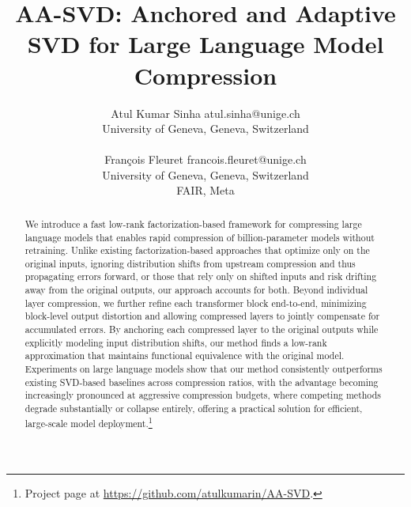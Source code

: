 \documentclass[10pt]{article} %
\title{AA-SVD: Anchored and Adaptive SVD for Large Language Model Compression}
\author{\name Atul Kumar Sinha \email atul.sinha@unige.ch \\
      University of Geneva, Geneva, Switzerland\\ \\
      \AND
      \name François Fleuret \email francois.fleuret@unige.ch \\
      University of Geneva, Geneva, Switzerland\\
      FAIR, Meta}
\theoremstyle{definition}
\theoremstyle{remark}
\begin{document}
\maketitle

\begin{abstract}
We introduce a fast low-rank factorization-based framework for compressing large language models that enables rapid compression of billion-parameter models without retraining. 
Unlike existing factorization-based approaches that optimize only on the original inputs, ignoring distribution shifts from upstream compression and thus propagating errors forward, or those that
rely only on shifted inputs and risk drifting away from the original outputs, our approach accounts for both. 
Beyond individual layer compression, we further refine each transformer block end-to-end, minimizing block-level output distortion and allowing compressed layers to jointly compensate for accumulated errors. By anchoring each compressed layer to the original outputs while explicitly modeling input distribution shifts, 
our method finds a low-rank approximation that maintains functional equivalence with the original model.
Experiments on large language models show that our method consistently outperforms existing SVD-based baselines across compression ratios, with the advantage becoming increasingly pronounced at aggressive compression budgets, where competing methods degrade substantially or collapse entirely, offering a practical solution for efficient, large-scale model deployment.\footnote{Project page at \url{https://github.com/atulkumarin/AA-SVD}.}

\end{abstract}
\end{document}
